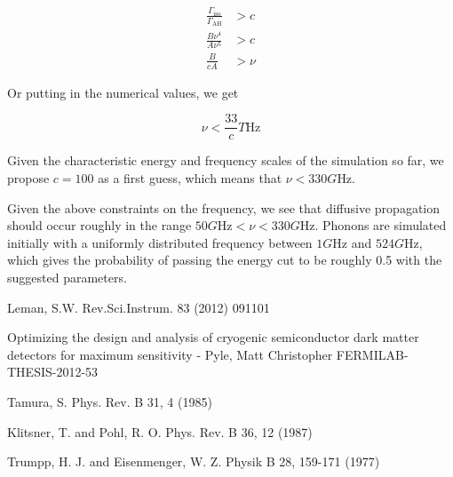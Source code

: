 \documentclass[11pt]{article}
\begin{document}
\begin{enumerate}
\begin{align*}
\frac{\Gamma_{\text{iso}}}{\Gamma_{\text{AH}}} &> c \\
\frac{B\nu^4}{A\nu^5} &> c \\
\frac{B}{cA} &> \nu
\end{align*}

Or putting in the numerical values, we get 

\begin{equation}
\nu < \frac{33}{c} \si{T\hertz}
\end{equation}

Given the characteristic energy and frequency scales of the simulation so far, we propose $c = 100$ as a first guess, 
which means that $\nu < 330\si{G\hertz}$.
\end{enumerate}

Given the above constraints on the frequency, we see that diffusive propagation should occur roughly in the range 
$50 \si{G\hertz} < \nu < 330 \si{G\hertz}$. Phonons are simulated initially with a uniformly distributed frequency between
$1 \si{G\hertz}$ and $524 \si{G\hertz}$, which gives the probability of passing the energy cut to be roughly 0.5 with the suggested 
parameters.
\pagebreak
\begin{thebibliography}{99} 
Leman, S.W. Rev.Sci.Instrum. 83 (2012) 091101 

Optimizing the design and analysis of cryogenic semiconductor dark matter detectors for maximum sensitivity - Pyle, Matt Christopher FERMILAB-THESIS-2012-53

Tamura, S. Phys. Rev. B 31, 4 (1985)

Klitsner, T. and Pohl, R. O. Phys. Rev. B 36, 12 (1987)

Trumpp, H. J. and Eisenmenger, W. Z. Physik B 28, 159-171 (1977)
\end{thebibliography}
\end{document}
